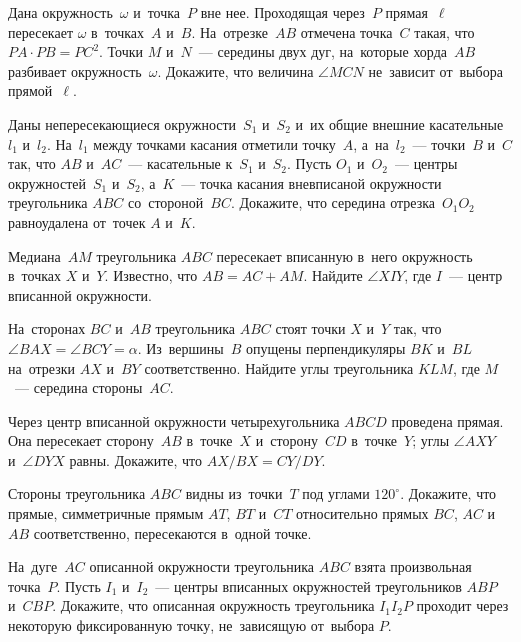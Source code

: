 



\begin{problems}

\item
Дана окружность~$\omega$ и~точка~$P$ вне нее.
Проходящая через~$P$ прямая~$\ell$ пересекает $\omega$ в~точках~$A$ и~$B$.
На~отрезке~$AB$ отмечена точка~$C$ такая, что $PA \cdot PB = PC^2$.
Точки $M$ и~$N$~--- середины двух дуг, на~которые хорда~$AB$ разбивает
окружность~$\omega$.
Докажите, что величина $\angle MCN$ не~зависит от~выбора прямой~$\ell$.

\item
Даны непересекающиеся окружности~$S_1$ и~$S_2$ и~их общие внешние
касательные $l_1$ и~$l_2$.
На~$l_1$ между точками касания отметили точку~$A$, а~на~$l_2$~---
точки~$B$ и~$C$ так, что $AB$ и~$AC$~--- касательные к~$S_1$ и~$S_2$.
Пусть $O_1$ и~$O_2$~--- центры окружностей~$S_1$ и~$S_2$, а~$K$~---
точка касания вневписаной окружности треугольника $ABC$ со~стороной~$BC$.
Докажите, что середина отрезка~$O_1 O_2$ равноудалена от~точек $A$ и~$K$.

\item
Медиана~$AM$ треугольника $ABC$ пересекает вписанную в~него окружность
в~точках $X$ и~$Y$.
Известно, что $AB = AC + AM$.
Найдите $\angle XIY$, где $I$~--- центр вписанной окружности.

\item
На~сторонах $BC$ и~$AB$ треугольника $ABC$ стоят точки $X$ и~$Y$ так, что
$\angle BAX = \angle BCY = \alpha$.
Из~вершины~$B$ опущены перпендикуляры $BK$ и~$BL$ на~отрезки $AX$ и~$BY$
соответственно.
Найдите углы треугольника $KLM$, где $M$~--- середина стороны~$AC$.

\item
Через центр вписанной окружности четырехугольника $ABCD$ проведена
прямая.
Она пересекает сторону~$AB$ в~точке~$X$ и~сторону~$CD$ в~точке~$Y$;
углы $\angle AXY$ и~$\angle DYX$ равны.
Докажите, что $AX / BX = CY / DY$.

\item
Стороны треугольника $ABC$ видны из~точки~$T$ под углами $120^\circ$.
Докажите, что прямые, симметричные прямым $AT$, $BT$ и~$CT$ относительно прямых
$BC$, $AC$ и~$AB$ соответственно, пересекаются в~одной точке.

\item
На~дуге~$AC$ описанной окружности треугольника $ABC$ взята произвольная
точка~$P$.
Пусть $I_1$ и~$I_2$~--- центры вписанных окружностей
треугольников $ABP$ и~$CBP$.
Докажите, что описанная окружность треугольника $I_1 I_2 P$ проходит через
некоторую фиксированную точку, не~зависящую от~выбора $P$.

\end{problems}

